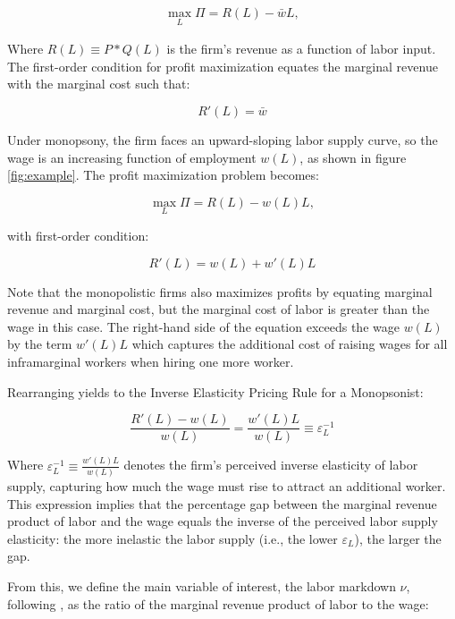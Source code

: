 \documentclass[12pt]{article}
\begin{document}
\begin{align}
\max_{L} \varPi = R(L) - \bar{w}L,
\end{align}

Where $R(L) \equiv P*Q(L)$ is the firm's revenue as a function of labor input. The first-order condition for profit maximization equates the marginal revenue with the marginal cost such that:

\begin{equation}
R'(L) = \bar{w}
\end{equation}

Under monopsony, the firm faces an upward-sloping labor supply curve, so the wage is an increasing function of employment $w(L)$, as shown in figure \ref{fig:example}. The profit maximization problem becomes:

\begin{equation}
\max_{L} \varPi = R(L) - w(L)L,
\end{equation}

with first-order condition:

\begin{equation}
R'(L) = w(L) + w'(L)L 
\end{equation}

Note that the monopolistic firms also maximizes profits by equating marginal revenue and marginal cost, but the marginal cost of labor is greater than the wage in this case. The right-hand side of the equation exceeds the wage $w(L)$ by the term $w'(L)L$ which captures the additional cost of raising wages for all inframarginal workers when hiring one more worker. 

Rearranging yields to the Inverse Elasticity Pricing Rule for a Monopsonist:

\begin{equation}
\frac{R'(L)-w(L)}{w(L)} = \frac{w'(L)L}{w(L)} \equiv \varepsilon_L^{-1}
\end{equation}

Where $\varepsilon_L^{-1} \equiv \frac{w'(L)L}{w(L)}$ denotes the firm’s perceived inverse elasticity of labor supply, capturing how much the wage must rise to attract an additional worker. This expression implies that the percentage gap between the marginal revenue product of labor and the wage equals the inverse of the perceived labor supply elasticity: the more inelastic the labor supply (i.e., the lower $\varepsilon_L$), the larger the gap.

From this, we define the main variable of interest, the labor markdown $\nu$, following \textcite{yeh_monopsony_2022}, as the ratio of the marginal revenue product of labor to the wage:
\end{document}
